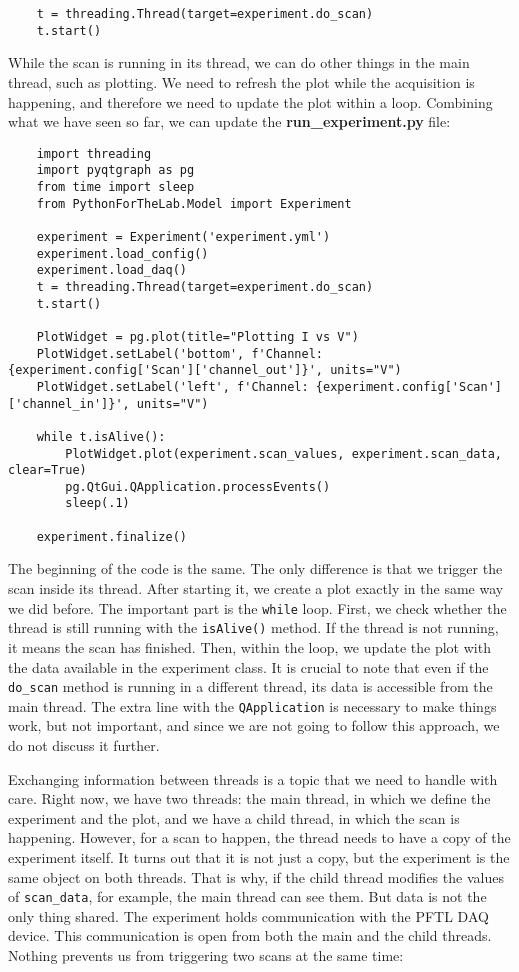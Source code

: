 \begin{verbatim}
    t = threading.Thread(target=experiment.do_scan)
    t.start()
\end{verbatim}

While the scan is running in its thread, we can do other things in the main thread, such as plotting. We need to refresh the plot while the acquisition is happening, and therefore we need to update the plot within a loop. Combining what we have seen so far, we can update the \textbf{run\_experiment.py} file:

\begin{verbatim}
    import threading
    import pyqtgraph as pg
    from time import sleep
    from PythonForTheLab.Model import Experiment

    experiment = Experiment('experiment.yml')
    experiment.load_config()
    experiment.load_daq()
    t = threading.Thread(target=experiment.do_scan)
    t.start()

    PlotWidget = pg.plot(title="Plotting I vs V")
    PlotWidget.setLabel('bottom', f'Channel: {experiment.config['Scan']['channel_out']}', units="V")
    PlotWidget.setLabel('left', f'Channel: {experiment.config['Scan']['channel_in']}', units="V")

    while t.isAlive():
        PlotWidget.plot(experiment.scan_values, experiment.scan_data, clear=True)
        pg.QtGui.QApplication.processEvents()
        sleep(.1)

    experiment.finalize()
\end{verbatim}

The beginning of the code is the same. The only difference is that we trigger the scan inside its thread. After starting it, we create a plot exactly in the same way we did before. The important part is the \texttt{while} loop. First, we check whether the thread is still running with the \texttt{isAlive()} method. If the thread is not running, it means the scan has finished. Then, within the loop, we update the plot with the data available in the experiment class. It is crucial to note that even if the \texttt{do\_scan} method is running in a different thread, its data is accessible from the main thread. The extra line with the \texttt{QApplication} is necessary to make things work, but not important, and since we are not going to follow this approach, we do not discuss it further.

Exchanging information between threads is a topic that we need to handle with care. Right now, we have two threads: the main thread, in which we define the experiment and the plot, and we have a child thread, in which the scan is happening. However, for a scan to happen, the thread needs to have a copy of the experiment itself. It turns out that it is not just a copy, but the experiment is the same object on both threads. That is why, if the child thread modifies the values of \texttt{scan\_data}, for example, the main thread can see them. But data is not the only thing shared. The experiment holds communication with the {PFTL DAQ} device. This communication is open from both the main and the child threads. Nothing prevents us from triggering two scans at the same time:


